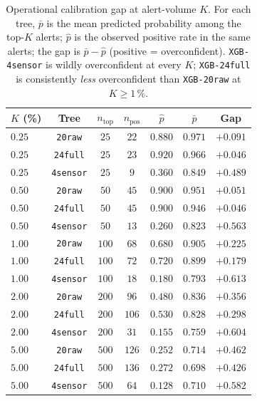 \begin{table}[t]
\centering
\small
\caption{Operational calibration gap at alert-volume $K$. For each tree,
$\bar{p}$ is the mean predicted probability among the top-$K$ alerts;
$\hat{p}$ is the observed positive rate in the same alerts; the gap is
$\bar{p} - \hat{p}$ (positive = overconfident). \texttt{XGB-4sensor} is
wildly overconfident at every $K$; \texttt{XGB-24full} is consistently
\emph{less} overconfident than \texttt{XGB-20raw} at $K \ge 1\,\%$.}
\label{tab:p8-op-cal}
\begin{tabular}{lcccccc}
\toprule
$K$ (\%) & Tree & $n_{\text{top}}$ & $n_{\text{pos}}$ & $\hat{p}$ & $\bar{p}$ & Gap \\
\midrule
$0.25$ & \texttt{20raw}  & $25$  & $22$ & $0.880$ & $0.971$ & $+0.091$ \\
$0.25$ & \texttt{24full} & $25$  & $23$ & $0.920$ & $0.966$ & $+0.046$ \\
$0.25$ & \texttt{4sensor}& $25$  & $9$  & $0.360$ & $0.849$ & $+0.489$ \\
$0.50$ & \texttt{20raw}  & $50$  & $45$ & $0.900$ & $0.951$ & $+0.051$ \\
$0.50$ & \texttt{24full} & $50$  & $45$ & $0.900$ & $0.946$ & $+0.046$ \\
$0.50$ & \texttt{4sensor}& $50$  & $13$ & $0.260$ & $0.823$ & $+0.563$ \\
$1.00$ & \texttt{20raw}  & $100$ & $68$ & $0.680$ & $0.905$ & $+0.225$ \\
$1.00$ & \texttt{24full} & $100$ & $72$ & $0.720$ & $0.899$ & $+0.179$ \\
$1.00$ & \texttt{4sensor}& $100$ & $18$ & $0.180$ & $0.793$ & $+0.613$ \\
$2.00$ & \texttt{20raw}  & $200$ & $96$ & $0.480$ & $0.836$ & $+0.356$ \\
$2.00$ & \texttt{24full} & $200$ & $106$& $0.530$ & $0.828$ & $+0.298$ \\
$2.00$ & \texttt{4sensor}& $200$ & $31$ & $0.155$ & $0.759$ & $+0.604$ \\
$5.00$ & \texttt{20raw}  & $500$ & $126$& $0.252$ & $0.714$ & $+0.462$ \\
$5.00$ & \texttt{24full} & $500$ & $136$& $0.272$ & $0.698$ & $+0.426$ \\
$5.00$ & \texttt{4sensor}& $500$ & $64$ & $0.128$ & $0.710$ & $+0.582$ \\
\bottomrule
\end{tabular}
\end{table}

